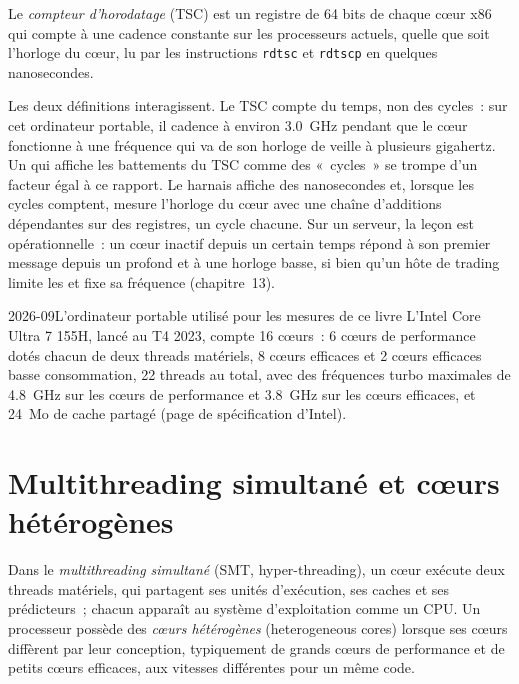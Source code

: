 \begin{definition}\label{def:ll:cpu-microarchitecture:tsc}
Le \emph{compteur d'horodatage} (TSC) est un registre de 64 bits de chaque cœur x86 qui compte à une
cadence constante sur les processeurs actuels, quelle que soit l'horloge du cœur, lu par les instructions \texttt{rdtsc} et
\texttt{rdtscp} en quelques nanosecondes.
\end{definition}

Les deux définitions interagissent. Le TSC compte du temps, non des cycles~: sur cet ordinateur portable, il cadence à environ 3.0~GHz pendant que le cœur
fonctionne à une fréquence qui va de son horloge de veille à plusieurs gigahertz. Un  qui affiche les battements du TSC comme des «~cycles~» se trompe d'un
facteur égal à ce rapport. Le harnais affiche des nanosecondes et, lorsque les cycles comptent, mesure l'horloge du cœur avec une chaîne d'additions dépendantes
sur des registres, un cycle chacune. Sur un serveur, la leçon est opérationnelle~: un cœur inactif depuis un certain temps
répond à son premier message depuis un  profond et à une horloge basse, si bien qu'un hôte de trading limite les  et fixe
sa fréquence (chapitre~13).

\begin{dated}{2026-09}{L'ordinateur portable utilisé pour les mesures de ce livre}\label{dat:ll:cpu-microarchitecture:laptop}
L'Intel Core Ultra 7 155H, lancé au T4 2023, compte 16 cœurs~: 6 cœurs de performance dotés chacun de deux
threads matériels, 8 cœurs efficaces et 2 cœurs efficaces basse consommation, 22 threads au total, avec des fréquences turbo maximales de
4.8~GHz sur les cœurs de performance et 3.8~GHz sur les cœurs efficaces, et 24~Mo de cache partagé (page
de spécification d'Intel).
\end{dated}

\section{Multithreading simultané et cœurs hétérogènes}

\begin{definition}\label{def:ll:cpu-microarchitecture:smt}
Dans le \emph{multithreading simultané} (SMT, hyper-threading), un cœur exécute deux
threads matériels, qui partagent ses unités d'exécution, ses caches et ses prédicteurs~; chacun apparaît au système d'exploitation comme un CPU.
Un processeur possède des \emph{cœurs hétérogènes} (heterogeneous cores) lorsque ses cœurs diffèrent par leur conception, typiquement de grands
cœurs de performance et de petits cœurs efficaces, aux vitesses différentes pour un même code.
\end{definition}

